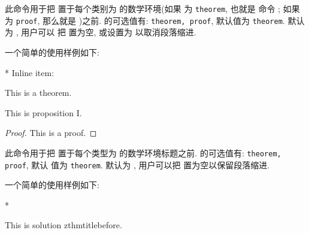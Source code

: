 \begin{function}[updated=2025-04-25]{\zthmbefore}
  \begin{syntax}
  \end{syntax}
  此命令用于把  置于每个类别为  的数学环境(如果  为 \texttt{theorem}, 也就是
  命令 ; 如果  为 \texttt{proof}, 那么就是  )之前.
   的可选值有: \texttt{theorem, proof}, 默认值为 \texttt{theorem}.  默认为 , 用户可以
  把  置为空, 或设置为  以取消段落缩进.\par 
  一个简单的使用样例如下:
\end{function}
\begin{DocExample}*
\zthmbefore{}
Inline item:%
\begin{theorem}[zthmbefore-1]
  This is a theorem.%
\end{theorem}%
\begin{proposition}[zthmbefore-2]
  This is proposition I.
\end{proposition}
\begin{proof}
  This is a proof.
\end{proof}
\end{DocExample}
\zthmbefore{\par}


\begin{function}[updated=2025-04-25]{\zthmtitlebefore}
  \begin{syntax}
  \end{syntax}
  此命令用于把  置于每个类型为  的数学环境标题之前.  的可选值有: \texttt{theorem, proof}, 默认
  值为 \texttt{theorem}.  默认为 , 用户可以把  置为空以保留段落缩进.\par 
  一个简单的使用样例如下:
\end{function}
\begin{DocExample}*
\begin{solution}
  This is solution zthmtitlebefore.
\end{solution}
\end{DocExample}
\zthmtitlebefore[proof]{\noindent}

